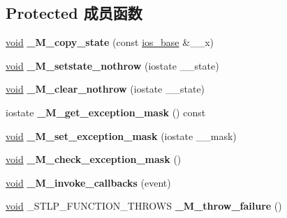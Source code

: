 \subsection*{Protected 成员函数}
\begin{DoxyCompactItemize}
\item 
\mbox{\label{classios__base_a7c2e29d2f3ae64162e5e09828179a315}} 
\hyperlink{interfacevoid}{void} {\bfseries \+\_\+\+M\+\_\+copy\+\_\+state} (const \hyperlink{classios__base}{ios\+\_\+base} \&\+\_\+\+\_\+x)
\item 
\mbox{\label{classios__base_a4cdb590623913812ba2df283c3d69090}} 
\hyperlink{interfacevoid}{void} {\bfseries \+\_\+\+M\+\_\+setstate\+\_\+nothrow} (iostate \+\_\+\+\_\+state)
\item 
\mbox{\label{classios__base_a2405cea5954443bf4efd35f00372862a}} 
\hyperlink{interfacevoid}{void} {\bfseries \+\_\+\+M\+\_\+clear\+\_\+nothrow} (iostate \+\_\+\+\_\+state)
\item 
\mbox{\label{classios__base_af00454075cb10a97d86fa9c2598610e7}} 
iostate {\bfseries \+\_\+\+M\+\_\+get\+\_\+exception\+\_\+mask} () const
\item 
\mbox{\label{classios__base_aed5d8d28809954798cd99750ae6918c9}} 
\hyperlink{interfacevoid}{void} {\bfseries \+\_\+\+M\+\_\+set\+\_\+exception\+\_\+mask} (iostate \+\_\+\+\_\+mask)
\item 
\mbox{\label{classios__base_a6e6d808a2289214db52c04ffadd8c203}} 
\hyperlink{interfacevoid}{void} {\bfseries \+\_\+\+M\+\_\+check\+\_\+exception\+\_\+mask} ()
\item 
\mbox{\label{classios__base_ad31917124d4ff61d4498cf50131fdde8}} 
\hyperlink{interfacevoid}{void} {\bfseries \+\_\+\+M\+\_\+invoke\+\_\+callbacks} (event)
\item 
\mbox{\label{classios__base_aff11acd7f9311cbd522332a9169d013d}} 
\hyperlink{interfacevoid}{void} \+\_\+\+S\+T\+L\+P\+\_\+\+F\+U\+N\+C\+T\+I\+O\+N\+\_\+\+T\+H\+R\+O\+WS {\bfseries \+\_\+\+M\+\_\+throw\+\_\+failure} ()
\end{DoxyCompactItemize}
